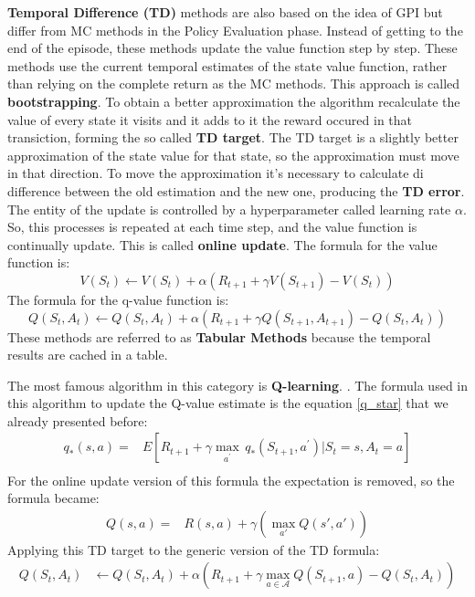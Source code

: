 \textbf{Temporal Difference (TD)} methods are also based on the idea of GPI but differ from MC methods in the Policy Evaluation phase.
Instead of getting to the end of the episode, these methods update the value function step by step.
These methods use the current temporal estimates of the state value function, rather than relying on the complete return as the MC methods. 
This approach is called \textbf{bootstrapping}.
To obtain a better approximation the algorithm recalculate the value of every state it visits and it adds to it the reward occured in that transiction, forming the so called \textbf{TD target}.
The TD target is a slightly better approximation of the state value for that state, so the approximation must move in that direction.
To move the approximation it's necessary to calculate di difference between the old estimation and the new one, producing the \textbf{TD error}.
The entity of the update is controlled by a hyperparameter called learning rate $\alpha.$
So, this processes is repeated at each time step, and the value function is continually update.
This is called \textbf{online update}.
The formula for the value function is:
\begin{equation*}
V(S_t) \leftarrow V(S_t) + \alpha(R_{t+1} + \gamma V(S_{t+1}) - V(S_t))
\end{equation*}
The formula for the q-value function is:
\begin{equation}
\label{q-update}
Q(S_t,A_t) \leftarrow Q(S_t,A_t) + \alpha(R_{t+1} + \gamma Q(S_{t+1},A_{t+1}) - Q(S_t,A_t))
\end{equation}
These methods are referred to as \textbf{Tabular Methods} because the temporal results are cached in a table. 

The most famous algorithm in this category is \textbf{Q-learning}.  \cite{watkins1992q}.
The formula used in this algorithm to update the Q-value estimate is the equation  \ref{q_star}  that we already presented before:
\begin{align*}
q_*(s,a) =&  E\left[ R_{t+1} + \gamma  \underset{a^{'}}{\max} \, q_*\left (S_{t+1}, a^{'} \right) | S_t = s, A_t = a   \right] \\
\end{align*}
For the online update version of this formula the expectation is removed, so the formula became:
\begin{align*}
Q(s,a) =& R(s,a) + \gamma  \left(  \underset{a'}{\max}Q (s',a') \right) 
\end{align*}
Applying this TD target to the generic version of the TD formula:
\begin{align*}
Q(S_t, A_t) &\leftarrow Q(S_t, A_t) + \alpha (R_{t+1} + \gamma \max_{a \in \mathcal{A}} Q(S_{t+1}, a) - Q(S_t, A_t)) \\
\end{align*}



